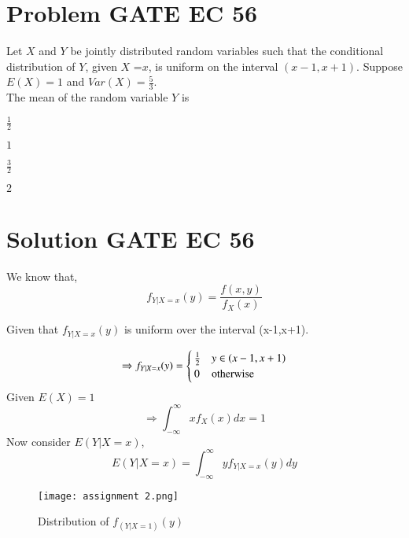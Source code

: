 \documentclass[journal,12pt,twocolumn]{IEEEtran}
\begin{document}
\section{Problem GATE EC 56}
Let $X$ and $Y$ be jointly distributed random variables such that the conditional distribution of $Y$, given $X$ =$x$, is uniform on the interval $(x-1,x+1)$. Suppose $E(X)=1$ and $Var(X)=\frac{5}{3}$.
\\
 The mean of the random variable $Y$ is 
\\
\begin{enumerate}[(A)]
\begin{multicols}{2}
\setlength\itemsep{1em}

\item $ \frac{1}{2}$\\
\item $1$\\
\item $ \frac{3}{2}$\\
\item $2$

\end{multicols}
\end{enumerate}
\section{Solution GATE EC 56}
We know that,
\begin{equation}
    f_{Y|X=x}(y)=\frac{f(x,y)}{f_{X}(x)} \label{eq:2.0.1}
\end{equation}

Given that $f_{Y|X=x}(y)$ is uniform over the interval (x-1,x+1).

\begin{equation}
    \Rightarrow f_{Y|X=x}(y)=
    \begin{cases}
    \frac{1}{2} & y \in \left(x-1,x+1\right)\\
    0 & \text{otherwise}
    \end{cases}\label{eq:2.0.2}
\end{equation}
Given $E(X)=1$
\begin{equation}
    \Rightarrow \int_{-\infty}^{\infty}x f_{X}(x)dx=1 \label{eq:2.0.3}
\end{equation}
Now consider $E(Y|X=x)$,
\begin{equation}
    E(Y|X=x)=\int_{-\infty}^{\infty}yf_{Y|X=x}(y)dy
\end{equation}
\begin{figure}[H]
    \centering
    \texttt{[image: assignment 2.png]}
    \caption{Distribution of $f_{(Y|X=1)}(y)$}
\end{figure}
\end{document}
